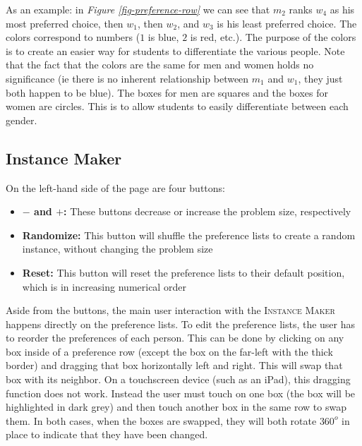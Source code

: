 As an example: in \textit{Figure \ref{fig-preference-row}} 
we can see that $m_2$ ranks $w_4$ as his most preferred choice, 
then $w_1$, then $w_2$, 
and $w_3$ is his least preferred choice.
\newline\newline
The colors correspond to numbers ($1$ is blue, $2$ is red, etc.). 
The purpose of the colors is to create an easier way for students to 
differentiate the various people. 
Note that the fact that the colors are the same for men and women holds no significance
(ie there is no inherent relationship between $m_1$ and $w_1$,
they just both happen to be blue).
The boxes for men are squares and the boxes for women are circles. 
This is to allow students to easily differentiate between each gender. 
\subsection{Instance Maker}
\hspace{-0.3in}
On the left-hand side of the page are four buttons:
\begin{itemize}
  \item\textbf{ $-$ and $+$:} These buttons decrease or increase the problem size, respectively
  \item \textbf{Randomize:} This button will shuffle the preference lists to create a 
  random instance, without changing the problem size
  \item \textbf{Reset:} This button will reset the preference lists to their default 
  position, which is in increasing numerical order
\end{itemize}
Aside from the buttons, the main user interaction with the \textsc{Instance Maker} 
happens directly on the preference lists. 
To edit the preference lists, the user has to reorder the preferences of each person.
This can be done by clicking on any box inside of a preference row 
(except the box on the far-left with the thick border) 
and dragging that box horizontally left and right. 
This will swap that box with its neighbor.
\newline\newline
On a touchscreen device (such as an iPad), this dragging function does not work. 
Instead the user must touch on one box 
(the box will be highlighted in dark grey)
and then touch another box in the same row to swap them.
\newline\newline
In both cases, when the boxes are swapped, they will both rotate $360^o$ in place 
to indicate that they have been changed.
